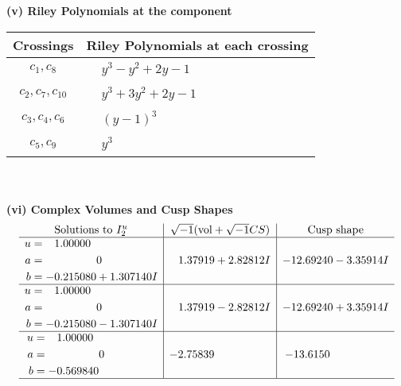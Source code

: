 \documentclass[1p]{elsarticle_modified}
\theoremstyle{definition}
\newcommand{\I}{\sqrt{-1}}
\begin{document}
\flushleft \textbf{(v) Riley Polynomials at the component}\newline \\
\begin{tabular}{m{50pt}|m{274pt}}
Crossings & \hspace{64pt}Riley Polynomials at each crossing \\
\hline $$\begin{aligned}c_{1},c_{8}\end{aligned}$$&$\begin{aligned}
&y^3- y^2+2 y-1
\end{aligned}$\\
\hline $$\begin{aligned}c_{2},c_{7},c_{10}\end{aligned}$$&$\begin{aligned}
&y^3+3 y^2+2 y-1
\end{aligned}$\\
\hline $$\begin{aligned}c_{3},c_{4},c_{6}\end{aligned}$$&$\begin{aligned}
&(y-1)^3
\end{aligned}$\\
\hline $$\begin{aligned}c_{5},c_{9}\end{aligned}$$&$\begin{aligned}
&y^3
\end{aligned}$\\
\hline
\end{tabular}\\~\\
\newpage\flushleft \textbf{(vi) Complex Volumes and Cusp Shapes}
$$\begin{array}{c|c|c}  
\text{Solutions to }I^u_{2}& \I (\text{vol} + \sqrt{-1}CS) & \text{Cusp shape}\\
 \hline 
\begin{aligned}
u &= \phantom{-}1.00000\phantom{ +0.000000I} \\
a &= \phantom{-0.000000 } 0 \\
b &= -0.215080 + 1.307140 I\end{aligned}
 & \phantom{-}1.37919 + 2.82812 I & -12.69240 - 3.35914 I \\ \hline\begin{aligned}
u &= \phantom{-}1.00000\phantom{ +0.000000I} \\
a &= \phantom{-0.000000 } 0 \\
b &= -0.215080 - 1.307140 I\end{aligned}
 & \phantom{-}1.37919 - 2.82812 I & -12.69240 + 3.35914 I \\ \hline\begin{aligned}
u &= \phantom{-}1.00000\phantom{ +0.000000I} \\
a &= \phantom{-0.000000 } 0 \\
b &= -0.569840\phantom{ +0.000000I}\end{aligned}
 & -2.75839\phantom{ +0.000000I} & -13.6150\phantom{ +0.000000I}\\
 \hline 
 \end{array}$$\newpage
\end{document}
